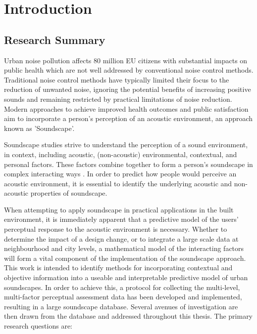 \chapter{Introduction}
\label{ch:intro}

\section{Research Summary}
Urban noise pollution affects 80 million EU citizens with substantial impacts on public health which are not well addressed by conventional noise control methods. Traditional noise control methods have typically limited their focus to the reduction of unwanted noise, ignoring the potential benefits of increasing positive sounds and remaining restricted by practical limitations of noise reduction. Modern approaches to achieve improved health outcomes and public satisfaction aim to incorporate a person's perception of an acoustic environment, an approach known as 'Soundscape'.

Soundscape studies strive to understand the perception of a sound environment, in context, including acoustic, (non-acoustic) environmental, contextual, and personal factors. These factors combine together to form a person's soundscape in complex interacting ways \citep{Berglund2006Tool}. In order to predict how people would perceive an acoustic environment, it is essential to identify the underlying acoustic and non-acoustic properties of soundscape.

When attempting to apply soundscape in practical applications in the built environment, it is immediately apparent that a predictive model of the users' perceptual response to the acoustic environment is necessary. Whether to determine the impact of a design change, or to integrate a large scale data at neighbourhood and city levels, a mathematical model of the interacting factors will form a vital component of the implementation of the soundscape approach. This work is intended to identify methods for incorporating contextual and objective information into a useable and interpretable predictive model of urban soundscapes. In order to achieve this, a protocol for collecting the multi-level, multi-factor perceptual assessment data has been developed and implemented, resulting in a large soundscape database. Several avenues of investigation are then drawn from the database and addressed throughout this thesis. The primary research questions are:

